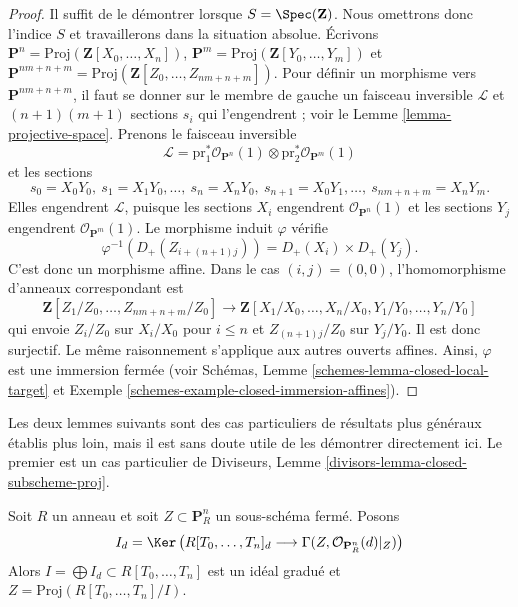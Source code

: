 \begin{proof}
Il suffit de le démontrer lorsque
$S = \Spec(\mathbf{Z})$. Nous omettrons donc
l'indice $S$ et travaillerons dans la situation absolue. Écrivons
$\mathbf{P}^n = \text{Proj}(\mathbf{Z}[X_0, \ldots, X_n])$,
$\mathbf{P}^m = \text{Proj}(\mathbf{Z}[Y_0, \ldots, Y_m])$ et
$\mathbf{P}^{nm + n + m} =
\text{Proj}(\mathbf{Z}[Z_0, \ldots, Z_{nm + n + m}])$.
Pour définir un morphisme vers
$\mathbf{P}^{nm + n + m}$, il faut se donner
sur le membre de gauche un faisceau inversible $\mathcal{L}$ et
$(n + 1)(m + 1)$ sections $s_i$ qui l'engendrent ; voir le
Lemme \ref{lemma-projective-space}. Prenons le faisceau inversible
$$
\mathcal{L} =
\text{pr}_1^*\mathcal{O}_{\mathbf{P}^n}(1)
\otimes
\text{pr}_2^*\mathcal{O}_{\mathbf{P}^m}(1)
$$
et les sections
$$
s_0 = X_0Y_0, \ s_1 = X_1Y_0, \ldots, \ s_n = X_nY_0,
\ s_{n + 1} = X_0Y_1, \ldots, \ s_{nm + n + m} = X_nY_m.
$$
Elles engendrent $\mathcal{L}$, puisque les sections $X_i$ engendrent
$\mathcal{O}_{\mathbf{P}^n}(1)$ et les sections $Y_j$ engendrent
$\mathcal{O}_{\mathbf{P}^m}(1)$. Le morphisme induit $\varphi$ vérifie
$$
\varphi^{-1}(D_{+}(Z_{i + (n + 1)j})) = D_{+}(X_i) \times D_{+}(Y_j).
$$
C'est donc un morphisme affine. Dans le cas $(i, j) = (0, 0)$,
l'homomorphisme d'anneaux correspondant est
$$
\mathbf{Z}[Z_1/Z_0, \ldots, Z_{nm + n + m}/Z_0]
\longrightarrow
\mathbf{Z}[X_1/X_0, \ldots, X_n/X_0, Y_1/Y_0, \ldots, Y_n/Y_0]
$$
qui envoie $Z_i/Z_0$ sur $X_i/X_0$ pour $i \leq n$ et
$Z_{(n + 1)j}/Z_0$ sur $Y_j/Y_0$. Il est
donc surjectif. Le même raisonnement
s'applique aux autres ouverts affines.
Ainsi, $\varphi$ est une immersion
fermée (voir Schémas, Lemme \ref{schemes-lemma-closed-local-target} et
Exemple \ref{schemes-example-closed-immersion-affines}).
\end{proof}

\noindent
Les deux lemmes suivants sont des cas particuliers de résultats plus généraux
établis plus loin, mais il est sans doute utile de les démontrer directement
ici. Le premier est un cas particulier de Diviseurs, Lemme \ref{divisors-lemma-closed-subscheme-proj}.

\begin{lemma}
\label{lemma-closed-in-projective-space}
Soit $R$ un anneau et soit $Z \subset \mathbf{P}^n_R$ un sous-schéma fermé.
Posons
$$
I_d = \Ker\left(
R[T_0, \ldots, T_n]_d
\longrightarrow
\Gamma(Z, \mathcal{O}_{\mathbf{P}^n_R}(d)|_Z)\right)
$$
Alors $I = \bigoplus I_d \subset R[T_0, \ldots, T_n]$ est un idéal gradué et
$Z = \text{Proj}(R[T_0, \ldots, T_n]/I)$.
\end{lemma}

